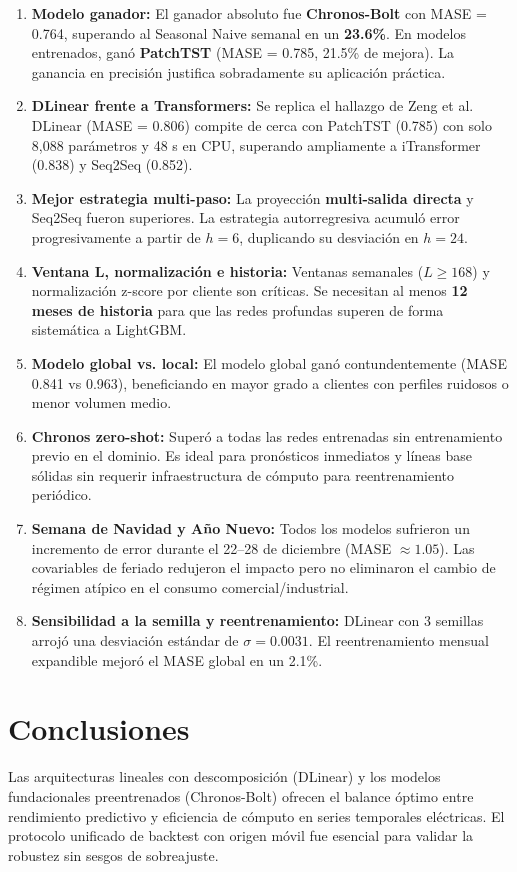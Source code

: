 \documentclass[10pt,letterpaper]{article}
\begin{document}
\begin{enumerate}\setlength\itemsep{0.12em}
    \item \textbf{Modelo ganador:} El ganador absoluto fue \textbf{Chronos-Bolt} con MASE = 0.764, superando al Seasonal Naive semanal en un \textbf{23.6\%}. En modelos entrenados, ganó \textbf{PatchTST} (MASE = 0.785, 21.5\% de mejora). La ganancia en precisión justifica sobradamente su aplicación práctica.
    \item \textbf{DLinear frente a Transformers:} Se replica el hallazgo de Zeng et al. DLinear (MASE = 0.806) compite de cerca con PatchTST (0.785) con solo 8,088 parámetros y 48 s en CPU, superando ampliamente a iTransformer (0.838) y Seq2Seq (0.852).
    \item \textbf{Mejor estrategia multi-paso:} La proyección \textbf{multi-salida directa} y Seq2Seq fueron superiores. La estrategia autorregresiva acumuló error progresivamente a partir de $h=6$, duplicando su desviación en $h=24$.
    \item \textbf{Ventana L, normalización e historia:} Ventanas semanales ($L \ge 168$) y normalización z-score por cliente son críticas. Se necesitan al menos \textbf{12 meses de historia} para que las redes profundas superen de forma sistemática a LightGBM.
    \item \textbf{Modelo global vs. local:} El modelo global ganó contundentemente (MASE 0.841 vs 0.963), beneficiando en mayor grado a clientes con perfiles ruidosos o menor volumen medio.
    \item \textbf{Chronos zero-shot:} Superó a todas las redes entrenadas sin entrenamiento previo en el dominio. Es ideal para pronósticos inmediatos y líneas base sólidas sin requerir infraestructura de cómputo para reentrenamiento periódico.
    \item \textbf{Semana de Navidad y Año Nuevo:} Todos los modelos sufrieron un incremento de error durante el 22--28 de diciembre (MASE $\approx 1.05$). Las covariables de feriado redujeron el impacto pero no eliminaron el cambio de régimen atípico en el consumo comercial/industrial.
    \item \textbf{Sensibilidad a la semilla y reentrenamiento:} DLinear con 3 semillas arrojó una desviación estándar de $\sigma = 0.0031$. El reentrenamiento mensual expandible mejoró el MASE global en un 2.1\%.
\end{enumerate}

\section{Conclusiones}
Las arquitecturas lineales con descomposición (DLinear) y los modelos fundacionales preentrenados (Chronos-Bolt) ofrecen el balance óptimo entre rendimiento predictivo y eficiencia de cómputo en series temporales eléctricas. El protocolo unificado de backtest con origen móvil fue esencial para validar la robustez sin sesgos de sobreajuste.
\end{document}
